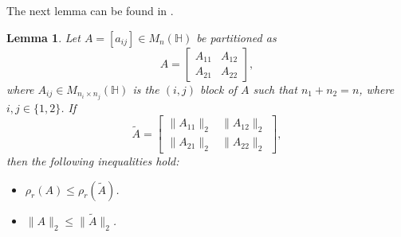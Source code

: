 \documentclass [12pt]{article}
\newtheorem{lemma}[theorem]{Lemma}
\begin{document}
\noindent The next lemma can be found in \cite{INT}.
    \begin{lemma}{\label{lemma 3.2}}
    Let \( A = [a_{ij}] \in M_n(\mathbb{H}) \) be partitioned as
    \[
    A = \begin{bmatrix}
        A_{11} & A_{12} \\
        A_{21} & A_{22}
    \end{bmatrix},
    \]
    where \( A_{ij} \in M_{n_i \times n_j}(\mathbb{H}) \) is the \((i,j)\) block of \( A \) such that \( n_1 + n_2 = n \), where \( i,j \in \{1,2\} \). If
    \[
    \tilde{A} = \begin{bmatrix}
        \|A_{11}\|_2 & \|A_{12}\|_2 \\
        \|A_{21}\|_2 & \|A_{22}\|_2
    \end{bmatrix},
    \]
    then the following inequalities hold:
    \begin{itemize}
        \item \( \rho_r(A) \leq \rho_r(\tilde{A}) \).
        \item \( \|A\|_2 \leq \|\tilde{A}\|_2 \).
    \end{itemize}
\end{lemma}
\end{document}
